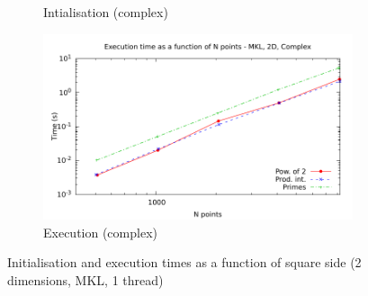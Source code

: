 \documentclass[12pt, a4paper]{article}
\begin{document}
\begin{figure}[H]
\begin{subfigure}{.5\textwidth}
\caption{Intialisation (complex)}
\label{2DMKLCI}
\end{subfigure}%
\begin{subfigure}{.5\textwidth}
\centering
\includegraphics[width=.9\linewidth]{graphs/2d-mkl-exec-c.pdf}
\caption{Execution (complex)}
\label{2DMKLC}
\end{subfigure}
\caption{Initialisation and execution times as a function of square side (2 dimensions, MKL, 1 thread)}
\label{2DMKL}
\end{figure}
\end{document}

